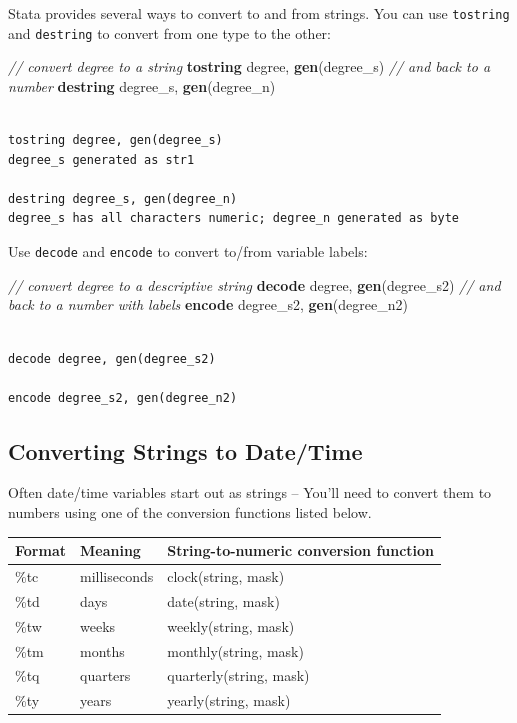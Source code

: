 \documentclass[]{book}
\newenvironment{Shaded}{\begin{snugshade}}{\end{snugshade}}
\newcommand{\CommentTok}[1]{\textcolor[rgb]{0.56,0.35,0.01}{\textit{#1}}}
\newcommand{\KeywordTok}[1]{\textcolor[rgb]{0.13,0.29,0.53}{\textbf{#1}}}
\newcommand{\NormalTok}[1]{#1}
\begin{document}
Stata provides several ways to convert to and from strings. You can use \texttt{tostring} and \texttt{destring} to convert from one type to the other:

\begin{Shaded}
\begin{Highlighting}[]
  \CommentTok{// convert degree to a string}
  \KeywordTok{tostring}\NormalTok{ degree, }\KeywordTok{gen}\NormalTok{(degree_s)}
  \CommentTok{// and back to a number}
  \KeywordTok{destring}\NormalTok{ degree_s, }\KeywordTok{gen}\NormalTok{(degree_n)}
\end{Highlighting}
\end{Shaded}

\begin{verbatim}

tostring degree, gen(degree_s)
degree_s generated as str1

destring degree_s, gen(degree_n)
degree_s has all characters numeric; degree_n generated as byte
\end{verbatim}

Use \texttt{decode} and \texttt{encode} to convert to/from variable labels:

\begin{Shaded}
\begin{Highlighting}[]
  \CommentTok{// convert degree to a descriptive string}
  \KeywordTok{decode}\NormalTok{ degree, }\KeywordTok{gen}\NormalTok{(degree_s2)}
  \CommentTok{// and back to a number with labels}
  \KeywordTok{encode}\NormalTok{ degree_s2, }\KeywordTok{gen}\NormalTok{(degree_n2)}
\end{Highlighting}
\end{Shaded}

\begin{verbatim}

decode degree, gen(degree_s2)

encode degree_s2, gen(degree_n2)
\end{verbatim}

\hypertarget{converting-strings-to-datetime}{%
\subsection{Converting Strings to Date/Time}\label{converting-strings-to-datetime}}

Often date/time variables start out as strings -- You'll need to convert them to numbers using one of the conversion functions listed below.

\begin{longtable}[]{@{}lll@{}}
\toprule
Format & Meaning & String-to-numeric conversion function\tabularnewline
\midrule
\endhead
\%tc & milliseconds & clock(string, mask)\tabularnewline
\%td & days & date(string, mask)\tabularnewline
\%tw & weeks & weekly(string, mask)\tabularnewline
\%tm & months & monthly(string, mask)\tabularnewline
\%tq & quarters & quarterly(string, mask)\tabularnewline
\%ty & years & yearly(string, mask)\tabularnewline
\bottomrule
\end{longtable}
\end{document}
